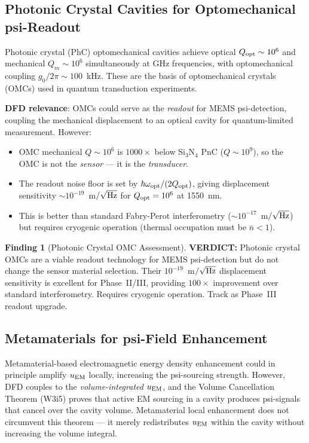 \documentclass[11pt]{article}
\theoremstyle{definition}
\newtheorem{finding}[theorem]{Finding}
\theoremstyle{remark}
\newcommand{\verdict}[1]{\textcolor{green!50!black}{\textbf{VERDICT:} #1}}
\begin{document}
\subsection{Photonic Crystal Cavities for Optomechanical psi-Readout}

Photonic crystal (PhC) optomechanical cavities achieve optical $Q_{\rm opt}
\sim 10^6$ and mechanical $Q_m \sim 10^6$ simultaneously at GHz
frequencies, with optomechanical coupling $g_0/2\pi \sim 100$~kHz.
These are the basis of optomechanical crystals (OMCs) used in
quantum transduction experiments.

\textbf{DFD relevance}: OMCs could serve as the \textit{readout}
for MEMS psi-detection, coupling the mechanical displacement to
an optical cavity for quantum-limited measurement. However:
\begin{itemize}[nosep]
\item OMC mechanical $Q \sim 10^6$ is $1000\times$ below Si$_3$N$_4$
  PnC ($Q \sim 10^9$), so the OMC is not the \textit{sensor} ---
  it is the \textit{transducer}.
\item The readout noise floor is set by $\hbar\omega_{\rm opt}/(2
  Q_{\rm opt})$, giving displacement sensitivity
  $\sim 10^{-19}$~m$/\sqrt{\rm Hz}$ for $Q_{\rm opt} = 10^6$
  at 1550~nm.
\item This is better than standard Fabry-Perot interferometry
  ($\sim 10^{-17}$~m$/\sqrt{\rm Hz}$) but requires cryogenic
  operation (thermal occupation must be $\bar{n} < 1$).
\end{itemize}

\begin{finding}[Photonic Crystal OMC Assessment]
\label{find:phc}
\verdict{Photonic crystal OMCs are a viable readout technology
for MEMS psi-detection but do not change the sensor material
selection. Their $10^{-19}$~m$/\sqrt{\rm Hz}$ displacement
sensitivity is excellent for Phase~II/III, providing $100\times$
improvement over standard interferometry. Requires cryogenic
operation. Track as Phase~III readout upgrade.}
\end{finding}

\subsection{Metamaterials for psi-Field Enhancement}

Metamaterial-based electromagnetic energy density enhancement could
in principle amplify $u_{\rm EM}$ locally, increasing the psi-sourcing
strength. However, DFD couples to the \textit{volume-integrated}
$u_{\rm EM}$, and the Volume Cancellation Theorem (W3i5) proves
that active EM sourcing in a cavity produces psi-signals that
cancel over the cavity volume. Metamaterial local enhancement does
not circumvent this theorem --- it merely redistributes $u_{\rm EM}$
within the cavity without increasing the volume integral.
\end{document}
